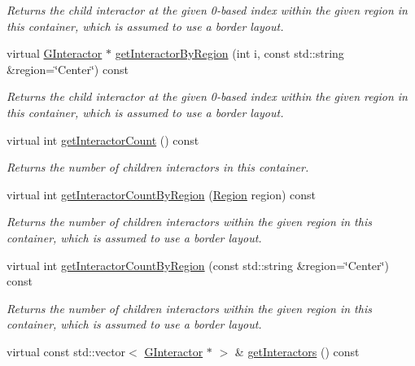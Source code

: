 \begin{DoxyCompactItemize}
\begin{DoxyCompactList}\small\item\em Returns the child interactor at the given 0-\/based index within the given region in this container, which is assumed to use a border layout. \end{DoxyCompactList}\item 
virtual \mbox{\hyperlink{classGInteractor}{G\+Interactor}} $\ast$ \mbox{\hyperlink{classGContainer_a576bbbb845c9bcf139fca956e3a4c757}{get\+Interactor\+By\+Region}} (int i, const std\+::string \&region=\char`\"{}Center\char`\"{}) const
\begin{DoxyCompactList}\small\item\em Returns the child interactor at the given 0-\/based index within the given region in this container, which is assumed to use a border layout. \end{DoxyCompactList}\item 
virtual int \mbox{\hyperlink{classGContainer_a789affbf8e89e65e3afd63cc626f5a81}{get\+Interactor\+Count}} () const
\begin{DoxyCompactList}\small\item\em Returns the number of children interactors in this container. \end{DoxyCompactList}\item 
virtual int \mbox{\hyperlink{classGContainer_a668fe9a4efc31fa065ded79c0e5eab64}{get\+Interactor\+Count\+By\+Region}} (\mbox{\hyperlink{classGContainer_a81a01a86de31071a92e6cce0bab9bc4b}{Region}} region) const
\begin{DoxyCompactList}\small\item\em Returns the number of children interactors within the given region in this container, which is assumed to use a border layout. \end{DoxyCompactList}\item 
virtual int \mbox{\hyperlink{classGContainer_ab51dbb723159efca4fc89e2c4211610c}{get\+Interactor\+Count\+By\+Region}} (const std\+::string \&region=\char`\"{}Center\char`\"{}) const
\begin{DoxyCompactList}\small\item\em Returns the number of children interactors within the given region in this container, which is assumed to use a border layout. \end{DoxyCompactList}\item 
virtual const std\+::vector$<$ \mbox{\hyperlink{classGInteractor}{G\+Interactor}} $\ast$ $>$ \& \mbox{\hyperlink{classGContainer_a04512d7151516f8a9e7298d72a290008}{get\+Interactors}} () const

\end{DoxyCompactItemize}
